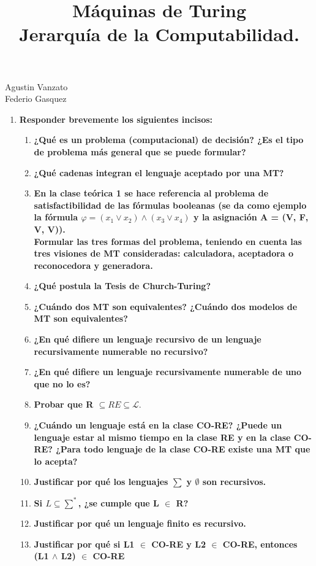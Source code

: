 \documentclass{article}
\title{Máquinas de Turing \\ Jerarquía de la Computabilidad.}
\begin{document}
\newenvironment{solution}{\begin{proof}[Solution]}{\end{proof}}
\maketitle

\large 

\begin{center}

{\Large Agustin Vanzato \\
Federio Gasquez} %
\end{center}
\vspace{0.05in}

\begin{enumerate}

\item \textbf{ Responder brevemente los siguientes incisos:}

\begin{enumerate}
\item \textbf{¿Qué es un problema (computacional) de decisión? ¿Es el tipo de problema más general que se puede formular?}
\item \textbf{¿Qué cadenas integran el lenguaje aceptado por una MT?}
\item \textbf{En la clase teórica 1 se hace referencia al problema de satisfactibilidad de las fórmulas booleanas (se da como ejemplo la fórmula $\varphi = (x_1 \vee x_2) \wedge (x_3 \vee x_4)$ y la asignación A = (V, F, V, V)).\\ Formular las tres formas del problema, teniendo en cuenta las tres visiones de MT consideradas: calculadora, aceptadora o reconocedora y generadora.}

\item \textbf{¿Qué postula la Tesis de Church-Turing?}


\item \textbf{¿Cuándo dos MT son equivalentes? ¿Cuándo dos modelos de MT son equivalentes?}
\item \textbf{¿En qué difiere un lenguaje recursivo de un lenguaje recursivamente numerable no recursivo?}
\item \textbf{¿En qué difiere un lenguaje recursivamente numerable de uno que no lo es?}
\item \textbf{Probar que R $\subseteq RE \subseteq \mathcal{L}.$}
\item \textbf{¿Cuándo un lenguaje está en la clase CO-RE? ¿Puede un lenguaje estar al mismo tiempo en la clase RE y en la clase CO-RE? ¿Para todo lenguaje de la clase CO-RE existe una MT que lo acepta?}
\item \textbf{Justificar por qué los lenguajes $\sum$ y $\emptyset$ son recursivos.}
\item \textbf{Si $L \subseteq \sum^*$, ¿se cumple que L $\in$ R?}
\item \textbf{Justificar por qué un lenguaje finito es recursivo.}
\item \textbf{Justificar por qué si L1 $\in$ CO-RE y L2 $\in$ CO-RE, entonces (L1 $\wedge$ L2) $\in$ CO-RE}
\end{enumerate}


\end{enumerate}
\end{document}
